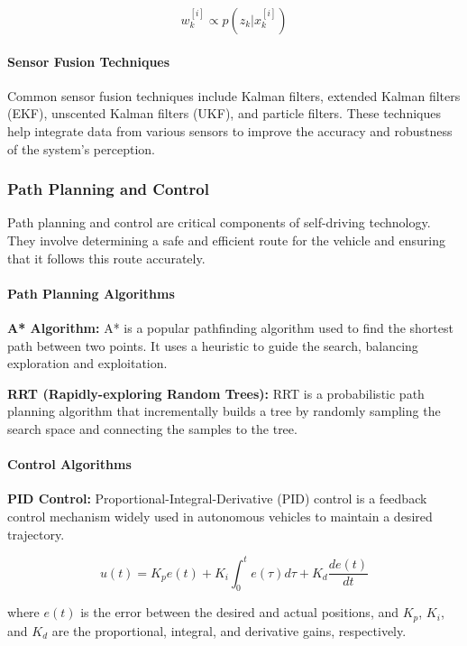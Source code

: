 \documentclass[12pt]{article}
\begin{document}
\[
w_k^{[i]} \propto p(z_k | x_k^{[i]})
\]

\paragraph{Sensor Fusion Techniques}

Common sensor fusion techniques include Kalman filters, extended Kalman filters (EKF), unscented Kalman filters (UKF), and particle filters. These techniques help integrate data from various sensors to improve the accuracy and robustness of the system's perception.

\subsubsection{Path Planning and Control}

Path planning and control are critical components of self-driving technology. They involve determining a safe and efficient route for the vehicle and ensuring that it follows this route accurately.

\paragraph{Path Planning Algorithms}

\textbf{A* Algorithm:} A* is a popular pathfinding algorithm used to find the shortest path between two points. It uses a heuristic to guide the search, balancing exploration and exploitation.

\textbf{RRT (Rapidly-exploring Random Trees):} RRT is a probabilistic path planning algorithm that incrementally builds a tree by randomly sampling the search space and connecting the samples to the tree.

\paragraph{Control Algorithms}

\textbf{PID Control:} Proportional-Integral-Derivative (PID) control is a feedback control mechanism widely used in autonomous vehicles to maintain a desired trajectory.

\[
u(t) = K_p e(t) + K_i \int_{0}^{t} e(\tau) d\tau + K_d \frac{de(t)}{dt}
\]

where \( e(t) \) is the error between the desired and actual positions, and \( K_p \), \( K_i \), and \( K_d \) are the proportional, integral, and derivative gains, respectively.
\end{document}

